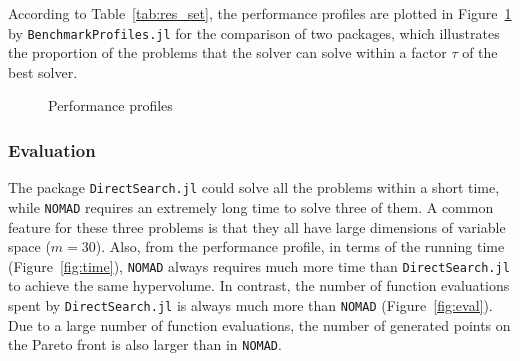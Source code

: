 \documentclass[11pt,oneside,onecolumn,openright]{article}
\begin{document}
According to Table~\ref{tab:res_set}, the performance profiles are plotted in Figure~\ref{fig:perform} by \verb|BenchmarkProfiles.jl| for the comparison of two packages, which illustrates the proportion of the problems that the solver can solve within a factor $\tau$ of the best solver.

   \begin{figure}[t]
  \centering
  \caption{Performance profiles}
  \label{fig:perform}
  \end{figure}

\subsubsection{Evaluation}
The package \verb|DirectSearch.jl| could solve all the problems within a short time, while \verb|NOMAD| requires an extremely long time to solve three of them. A common feature for these three problems is that they all have large dimensions of variable space ($m=30$). Also, from the performance profile, in terms of the running time (Figure~\ref{fig:time}), \verb|NOMAD| always requires much more time than \verb|DirectSearch.jl| to achieve the same hypervolume. In contrast, the number of function evaluations spent by \verb|DirectSearch.jl| is always much more than \verb|NOMAD| (Figure~\ref{fig:eval}). Due to a large number of function evaluations, the number of generated points on the Pareto front is also larger than in \verb|NOMAD|.
\end{document}

